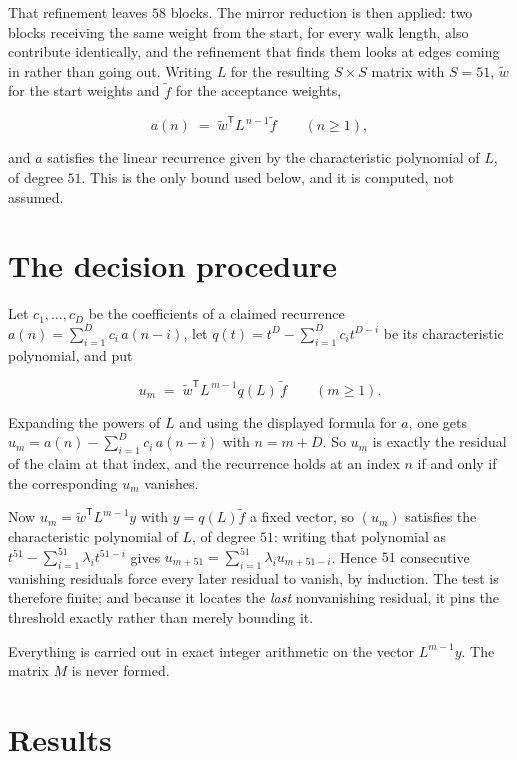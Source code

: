 \documentclass[11pt]{article}
\theoremstyle{definition}
\begin{document}
That refinement leaves $58$ blocks. The mirror reduction is then applied: two blocks receiving the same weight from the start, for every walk length, also contribute identically, and the refinement that finds them looks at edges coming in rather than going out. Writing $L$ for the resulting $S \times S$ matrix with $S = 51$, $\tilde w$ for the start weights and $\tilde f$ for the acceptance weights,

\[a(n) \;=\; \tilde w^{\mathsf T} L^{\,n-1} \tilde f \qquad (n \ge 1),\]

and $a$ satisfies the linear recurrence given by the characteristic polynomial of $L$, of degree $51$. This is the only bound used below, and it is computed, not assumed.

\section{The decision procedure}

Let $c_1,\dots,c_D$ be the coefficients of a claimed recurrence $a(n) = \sum_{i=1}^{D} c_i\,a(n-i)$, let $q(t) = t^{D} - \sum_{i=1}^{D} c_i t^{D-i}$ be its characteristic polynomial, and put

\[u_m \;=\; \tilde w^{\mathsf T} L^{\,m-1} q(L)\,\tilde f \qquad (m \ge 1).\]

Expanding the powers of $L$ and using the displayed formula for $a$, one gets $u_m = a(n) - \sum_{i=1}^{D} c_i\,a(n-i)$ with $n = m + D$. So $u_m$ is exactly the residual of the claim at that index, and the recurrence holds at an index $n$ if and only if the corresponding $u_m$ vanishes.

Now $u_m = \tilde w^{\mathsf T} L^{m-1} y$ with $y = q(L)\tilde f$ a fixed vector, so $(u_m)$ satisfies the characteristic polynomial of $L$, of degree $51$: writing that polynomial as $t^{51} - \sum_{i=1}^{51} \lambda_i t^{51-i}$ gives $u_{m+51} = \sum_{i=1}^{51} \lambda_i u_{m+51-i}$. Hence $51$ consecutive vanishing residuals force every later residual to vanish, by induction. The test is therefore finite; and because it locates the {\itshape last} nonvanishing residual, it pins the threshold exactly rather than merely bounding it.

Everything is carried out in exact integer arithmetic on the vector $L^{m-1}y$. The matrix $M$ is never formed.

\section{Results}
\end{document}
